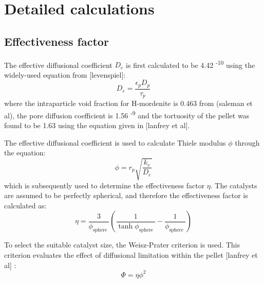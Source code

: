 \section{Detailed calculations}
\label{app:reaction}

\subsection{Effectiveness factor}

The effective diffusional coefficient $D_e$ is first calculated to be 4.42 \textsuperscript{-10} using the widely-used equation from [levenspiel]: 
\begin{equation}
    D_e = \frac{\epsilon_p D_p}{\tau_p}
\end{equation}
where the intraparticle void fraction for H-mordenite is 0.463 from (saleman et al), the pore diffusion coefficient is 1.56 \textsuperscript{-9} and the tortuosity of the pellet was found to be 1.63 using the equation given in [lanfrey et al]. 

The effective diffusional coefficient is used to calculate Thiele modulus $\phi$ through the equation:
\begin{equation}
    \phi = r_p \sqrt{\frac{k_v}{D_e}}
\end{equation}
which is subsequently used to determine the effectiveness factor $\eta$. The catalysts are assumed to be perfectly spherical, and therefore the effectiveness factor is calculated as: 
\begin{equation}
\eta=\frac{3}{\phi_{\text {sphere }}}\left(\frac{1}{\tanh \phi_{\text {sphere }}}-\frac{1}{\phi_{\text {sphere }}}\right)
\end{equation}

To select the suitable catalyst size, the Weisz-Prater criterion is used. This criterion evaluates the effect of diffusional limitation within the pellet [lanfrey et al] :
\begin{equation}
    \Phi = \eta \phi^2
\end{equation}




